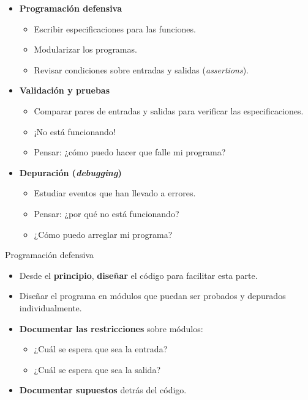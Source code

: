\documentclass[mathserif]{beamer}
\begin{document}
\begin{frame}[fragile]{}
    \begin{itemize}
        \item {\blue\bfseries Programación defensiva}
        \begin{itemize}
            \item Escribir {\orange especificaciones} para las funciones.
            \item {\orange Modularizar} los programas.
            \item Revisar {\orange condiciones} sobre entradas y salidas (\textit{assertions}).
        \end{itemize}
        
        \item {\blue\bfseries Validación y pruebas}
        \begin{itemize}
            \item {\orange Comparar} pares de entradas y salidas para verificar las especificaciones.
            \item ¡No está funcionando!
            \item Pensar: ¿cómo puedo hacer que falle mi programa?
        \end{itemize}
        
        \item {\blue\bfseries Depuración (\textit{debugging})}
        \begin{itemize}
            \item {\orange Estudiar eventos} que han llevado a errores.
            \item Pensar: ¿por qué no está funcionando?
            \item ¿Cómo puedo arreglar mi programa?
        \end{itemize}
    \end{itemize}
\end{frame}

\begin{frame}[fragile]{Programación defensiva}
    \begin{itemize}
        \item Desde el {\orange\bfseries principio}, {\blue\bfseries diseñar} el código para facilitar esta parte.
        
        \item Diseñar el programa en {\blue módulos} que puedan ser probados y depurados individualmente.
        
        \item {\blue\bfseries Documentar las restricciones} sobre módulos:
        \begin{itemize}
            \item ¿Cuál se espera que sea la entrada?
            \item ¿Cuál se espera que sea la salida?
        \end{itemize}
        
        \item {\blue\bfseries Documentar supuestos} detrás del código.
    \end{itemize}
\end{frame}
\end{document}
